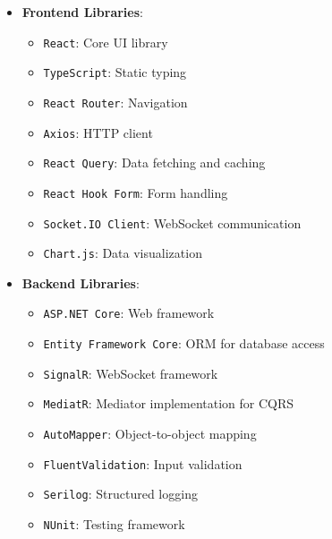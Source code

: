 \begin{itemize}
    \item \textbf{Frontend Libraries}:
    \begin{itemize}
        \item \texttt{React}: Core UI library
        \item \texttt{TypeScript}: Static typing
        \item \texttt{React Router}: Navigation
        \item \texttt{Axios}: HTTP client
        \item \texttt{React Query}: Data fetching and caching
        \item \texttt{React Hook Form}: Form handling
        \item \texttt{Socket.IO Client}: WebSocket communication
        \item \texttt{Chart.js}: Data visualization
    \end{itemize}
    
    \item \textbf{Backend Libraries}:
    \begin{itemize}
        \item \texttt{ASP.NET Core}: Web framework
        \item \texttt{Entity Framework Core}: ORM for database access
        \item \texttt{SignalR}: WebSocket framework
        \item \texttt{MediatR}: Mediator implementation for CQRS
        \item \texttt{AutoMapper}: Object-to-object mapping
        \item \texttt{FluentValidation}: Input validation
        \item \texttt{Serilog}: Structured logging
        \item \texttt{NUnit}: Testing framework
    \end{itemize}
\end{itemize}


